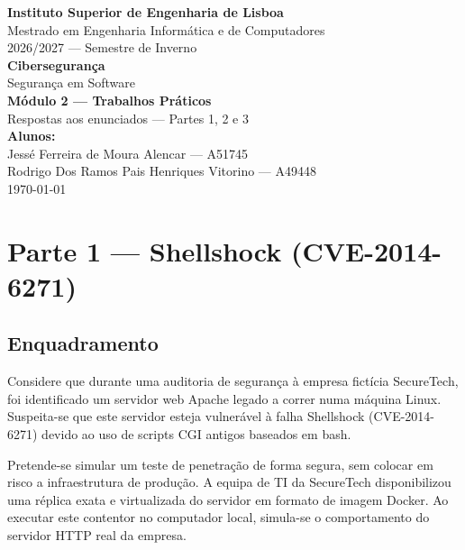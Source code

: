 \documentclass[11pt,a4paper]{article}
\begin{document}
\begin{titlepage}
\centering
\vspace*{2cm}
{\Large\textbf{Instituto Superior de Engenharia de Lisboa}}\\[0.4cm]
{\large Mestrado em Engenharia Informática e de Computadores}\\[0.2cm]
{\large 2026/2027 --- Semestre de Inverno}\\[2cm]

{\Huge\textbf{Cibersegurança}}\\[0.4cm]
{\LARGE Segurança em Software}\\[1cm]
{\Large\textbf{Módulo 2 --- Trabalhos Práticos}}\\[0.3cm]
{\large Respostas aos enunciados --- Partes 1, 2 e 3}\\[3cm]

{\large\textbf{Alunos:}}\\[0.4cm]
{\large Jessé Ferreira de Moura Alencar --- A51745}\\[0.2cm]
{\large Rodrigo Dos Ramos Pais Henriques Vitorino --- A49448}\\[0.2cm]

\vfill
{\large \today}
\end{titlepage}

\tableofcontents
\newpage

\section{Parte 1 --- Shellshock (CVE-2014-6271)}

\subsection*{Enquadramento}

Considere que durante uma auditoria de segurança à empresa fictícia SecureTech, foi
identificado um servidor web Apache legado a correr numa máquina Linux. Suspeita-se que
este servidor esteja vulnerável à falha Shellshock (CVE-2014-6271) devido ao uso de
scripts CGI antigos baseados em bash.

Pretende-se simular um teste de penetração de forma segura, sem colocar em risco a
infraestrutura de produção. A equipa de TI da SecureTech disponibilizou uma réplica exata
e virtualizada do servidor em formato de imagem Docker. Ao executar este contentor no
computador local, simula-se o comportamento do servidor HTTP real da empresa.
\end{document}
